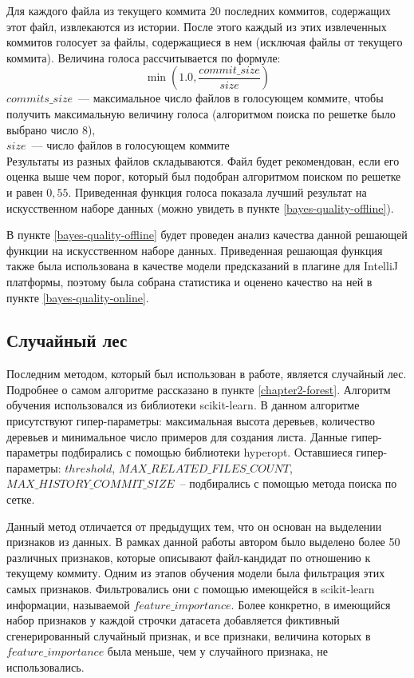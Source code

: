 Для каждого файла из текущего коммита 20 последних коммитов, содержащих этот файл, извлекаются из истории. После этого каждый из этих извлеченных коммитов голосует за файлы, содержащиеся в нем (исключая файлы от текущего коммита). Величина голоса рассчитывается по формуле: 
    $$\min(1.0, \frac{{commit\_size}}{{size}})$$
$commits\_size$~---  максимальное число файлов в голосующем коммите, чтобы получить максимальную величину голоса (алгоритмом поиска по решетке было выбрано число 8),\\
$size$~--- число файлов в голосующем коммите\\
Результаты из разных файлов складываются. Файл будет рекомендован, если его оценка выше чем порог, который был подобран алгоритмом поиском по решетке и равен $0,55$. Приведенная функция голоса показала лучший результат на искусственном наборе данных (можно увидеть в пункте \ref{bayes-quality-offline}).

В пункте \ref{bayes-quality-offline} будет проведен анализ качества данной решающей функции на искусственном наборе данных. Приведенная решающая функция также была использована в качестве модели предсказаний в плагине для IntelliJ платформы, поэтому была собрана статистика и оценено качество на ней в пункте \ref{bayes-quality-online}. 
    \subsection{Случайный лес}\label{chapter3-forest}
Последним методом, который был использован в работе, является случайный лес. Подробнее о самом алгоритме рассказано в пункте \ref{chapter2-forest}. Алгоритм обучения использовался из библиотеки scikit-learn. В данном алгоритме присутствуют гипер-параметры: максимальная высота деревьев, количество деревьев и минимальное число примеров для создания листа. Данные гипер-параметры подбирались с помощью библиотеки hyperopt. Оставшиеся гипер-параметры: $threshold$, $MAX\_RELATED\_FILES\_COUNT$, $MAX\_HISTORY\_COMMIT\_SIZE$~-- подбирались с помощью метода поиска по сетке. 

Данный метод отличается от предыдущих тем, что он основан на выделении признаков из данных. В рамках данной работы автором было выделено более 50 различных признаков, которые описывают файл-кандидат по отношению к текущему коммиту. Одним из этапов обучения модели была фильтрация этих самых признаков. Фильтровались они с помощью имеющейся в scikit-learn информации, называемой $feature\_importance$. Более конкретно, в имеющийся набор признаков у каждой строчки датасета добавляется фиктивный сгенерированный случайный признак, и все признаки, величина которых в $feature\_importance$ была меньше, чем у случайного признака, не использовались.

